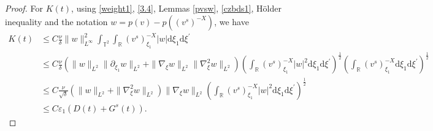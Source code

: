 \documentclass[10pt,reqno]{amsart}
\numberwithin{equation}{section}
\newcommand{\dif}{\mathrm{d}}
\begin{document}
\begin{proof}
For $K(t)$, using \eqref{weight1}, \eqref{3.4}, Lemmas \ref{pvsw}, \ref{czbds1}, H\"older inequality and the notation $w=p(v)-p((v^s)^{-X})$, we have
 \begin{align*}
 K(t)&\le C\frac{\nu}{\delta}\|w\|^2_{L^\infty}\int_{\mathbb{T}^2}\int_{\mathbb{R}}(v^s)^{-X}_{\xi_1}|w|\dif \xi_1\dif \xi^{\prime}\\
 &\le C\frac{\nu}{\delta}(\|w\|_{L^2}\|\partial_{\xi_1}w\|_{L^2}
 +\|\nabla_\xi w\|_{L^2}\|\nabla_\xi^2 w\|_{L^2})\left(\int_{\mathbb{R}}(v^s)^{-X}_{\xi_1}|w|^2\dif \xi_1\dif \xi^{\prime}\right)^{\frac{1}{2}}\left(\int_{\mathbb{R}}(v^s)^{-X}_{\xi_1}\dif \xi_1\dif \xi^{\prime}\right)^{\frac{1}{2}}\\
 &\le C\frac{\nu}{\sqrt{\delta}}(\|w\|_{L^2}
 +\|\nabla_\xi^2 w\|_{L^2})\|\nabla_\xi w\|_{L^2}\left(\int_{\mathbb{R}}(v^s)^{-X}_{\xi_1}|w|^2\dif \xi_1\dif \xi^{\prime}\right)^{\frac{1}{2}}\\
 &\le C\varepsilon_1(D(t)+G^s(t)).
 \end{align*}


\end{proof}
\end{document}
